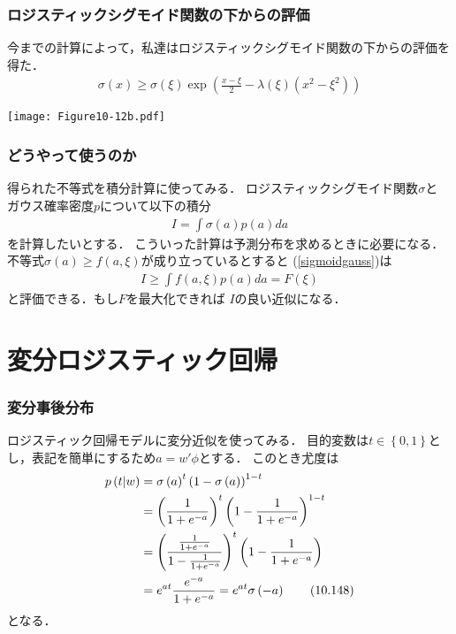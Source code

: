 \documentclass[10pt,hyperref={unicode}]{beamer}
\newcommand{\paref}[1]{{\fontfamily{cmr}\selectfont (\ref{#1})}}
\newcommand{\parentheses}[1]{\left(#1\right)}
\newcommand{\braces}[1]{\left\{#1\right\}}
\begin{document}
\begin{frame}
\frametitle{ロジスティックシグモイド関数の下からの評価}
今までの計算によって，私達はロジスティックシグモイド関数の下からの評価を得た．
\begin{align*}
    \sigma\parentheses{x} \geq \sigma\parentheses{\xi}\exp\parentheses{\frac{x - \xi}{2} - \lambda\parentheses{\xi}\parentheses{x^2 - \xi^2}}
\end{align*}

\smallskip

\begin{center}
    \texttt{[image: Figure10-12b.pdf]}
\end{center}
\end{frame}

\begin{frame}
\frametitle{どうやって使うのか}
得られた不等式を積分計算に使ってみる．
ロジスティックシグモイド関数$\sigma$と
ガウス確率密度$p$について以下の積分
\begin{align}
    I = \int \sigma\parentheses{a}p\parentheses{a}da \tag{10.145} \label{sigmoidgauss}
\end{align}
を計算したいとする．
こういった計算は予測分布を求めるときに必要になる．
不等式$\sigma\parentheses{a} \geq f\parentheses{a,\xi}$が成り立っているとすると
\paref{sigmoidgauss}は
\begin{align}
    I \geq \int f\parentheses{a,\xi}p\parentheses{a}da = F\parentheses{\xi} \tag{10.146}
\end{align}
と評価できる．もし$F$を最大化できれば
$I$の良い近似になる．
\end{frame}

\section{変分ロジスティック回帰}
\begin{frame}
\frametitle{変分事後分布}
ロジスティック回帰モデルに変分近似を使ってみる．
目的変数は$t \in \braces{0,1}$とし，表記を簡単にするため$a = w'\phi$とする．
このとき尤度は
\begin{align}
    p\parentheses{t|w}
    &= \sigma\parentheses{a}^t\parentheses{1 - \sigma\parentheses{a}}^{1-t}\notag \\
    &= \parentheses{\frac{1}{1 + e^{-a}}}^t \parentheses{1 - \frac{1}{1 + e^{-a}}}^{1 - t} \notag \\
    &= \parentheses{\frac{\frac{1}{1 + e^{-a}}}{1 - \frac{1}{1 + e^{-a}}}}^t \parentheses{1 - \frac{1}{1 + e^{-a}}}\notag \\
    &= e^{at} \frac{e^{-a}}{1 + e^{-a}} = e^{at}\sigma\parentheses{-a} \tag{10.148}
\end{align}
となる．
\end{frame}
\end{document}
